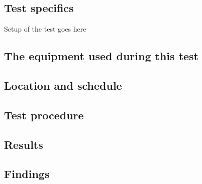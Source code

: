 \subsection{Test specifics}
Setup of the test goes here

\subsection*{The equipment used during this test}

\subsection*{Location and schedule}

\subsection*{Test procedure}

\subsection{Results}

\subsection{Findings}


